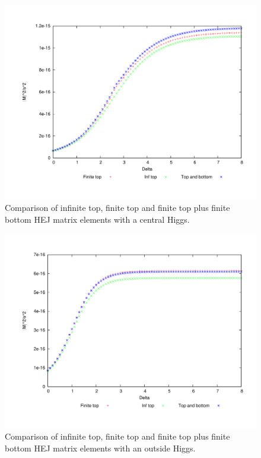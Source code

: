 \begin{figure}[t]
\centering
\includegraphics[scale=0.5]{Images/qg_qgH_compare_central.pdf}
\caption{Comparison of infinite top, finite top and finite top plus finite bottom HEJ matrix elements with a central Higgs.}
\label{fig:qg_qgh_compare}
\end{figure}

\begin{figure}[H]
\centering
\includegraphics[scale=0.5]{Images/qg_qgH_compare_outside.pdf}
\caption{Comparison of infinite top, finite top and finite top plus finite bottom HEJ matrix elements with an outside Higgs.}
\label{fig:qg_qgh_compare_out}
\end{figure}

